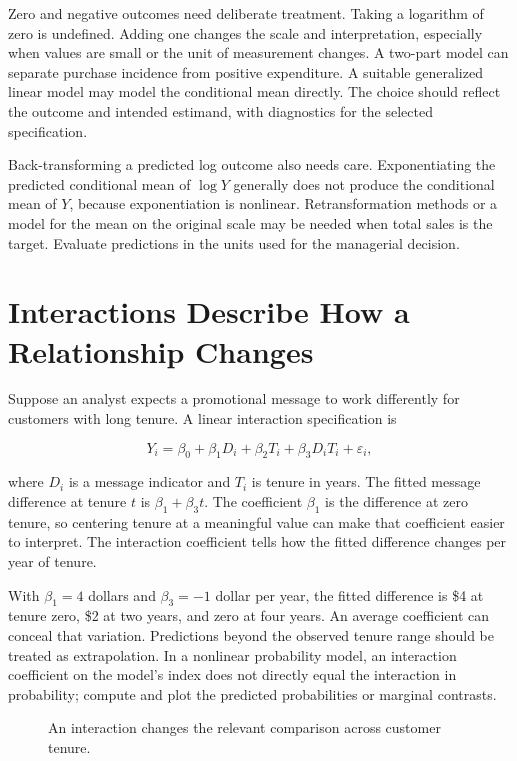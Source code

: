 Zero and negative outcomes need deliberate treatment. Taking a logarithm
of zero is undefined. Adding one changes the scale and interpretation,
especially when values are small or the unit of measurement changes. A
two-part model can separate purchase incidence from positive
expenditure. A suitable generalized linear model may model the
conditional mean directly. The choice should reflect the outcome and
intended estimand, with diagnostics for the selected specification.

Back-transforming a predicted log outcome also needs care.
Exponentiating the predicted conditional mean of \(\log Y\) generally
does not produce the conditional mean of \(Y\), because exponentiation
is nonlinear. Retransformation methods or a model for the mean on the
original scale may be needed when total sales is the target. Evaluate
predictions in the units used for the managerial decision.

\hypertarget{M03-interactions-describe-how-a-relationship-changes}{%
\section{Interactions Describe How a Relationship
Changes}\label{M03-interactions-describe-how-a-relationship-changes}}

\noindent Suppose an analyst expects a promotional message to work differently for
customers with long tenure. A linear interaction specification is

\[
Y_i=\beta_0+\beta_1D_i+\beta_2T_i+\beta_3D_iT_i+\varepsilon_i,
\]

where \(D_i\) is a message indicator and \(T_i\) is tenure in years. The
fitted message difference at tenure \(t\) is \(\beta_1+\beta_3t\). The
coefficient \(\beta_1\) is the difference at zero tenure, so centering
tenure at a meaningful value can make that coefficient easier to
interpret. The interaction coefficient tells how the fitted difference
changes per year of tenure.

With \(\beta_1=4\) dollars and \(\beta_3=-1\) dollar per year, the
fitted difference is \$4 at tenure zero, \$2 at two years, and zero at
four years. An average coefficient can conceal that variation.
Predictions beyond the observed tenure range should be treated as
extrapolation. In a nonlinear probability model, an interaction
coefficient on the model's index does not directly equal the interaction
in probability; compute and plot the predicted probabilities or marginal
contrasts.

\begin{figure}[htbp]
\centering

\caption{An interaction changes the relevant comparison across customer tenure.}\label{fig:M03_interaction}
\end{figure}


